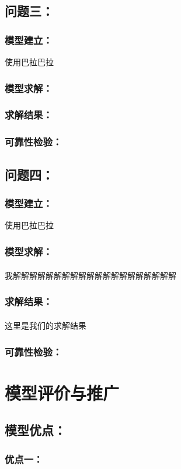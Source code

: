 \documentclass[zihao=-4, UTF8]{article}		%
\theoremstyle{MyLineTheoremStyle} %
\theoremstyle{MyBlockTheoremStyle} %
\theoremstyle{MySubsubsectionStyle} %
\newcommand{\upcite}[1]{\textsuperscript{\cite{#1}}}     %
\begin{document}
\subsection{问题三：}
\subsubsection{模型建立：}
使用巴拉巴拉
\subsubsection{模型求解：}
\subsubsection{求解结果：}
\subsubsection{可靠性检验：}

\subsection{问题四：}
\subsubsection{模型建立：}
使用巴拉巴拉
\subsubsection{模型求解：}
我解解解解解解解解解解解解解解解解解解解解 \upcite{徐晓平}
\subsubsection{求解结果：}
这里是我们的求解结果 \upcite{张春琳}
\subsubsection{可靠性检验：}

\section{模型评价与推广}
\subsection{模型优点：}
\subsubsection{优点一：}
\end{document}
